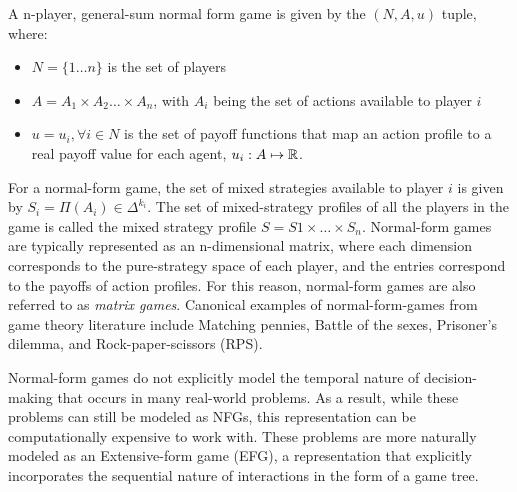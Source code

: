 \begin{definition} A n-player, general-sum normal form game is given by the $(N,
		A, u)$ tuple, where:
	\begin{itemize}
		\item $N = \{1 \dots n \}$ is the set of players
		\item $A =
			      A_1 \times A_2 \ldots \times A_n$, with $A_i$ being the set of actions available to player $i$
		\item $u = {u_i, \forall i \in N}$ is the set of payoff functions that map an action profile to a
		      real payoff value for each agent, $u_i: A \mapsto \mathbb{R}$.
	\end{itemize}
\end{definition}

For a normal-form game, the set of mixed strategies available to player $i$ is given by $S_i =
	\Pi(A_i) \in \Delta^{k_i}$.
The set of mixed-strategy profiles of all the players in the game is called the mixed strategy
profile $S = S1 \times \dots \times S_n$.
Normal-form games are typically represented as an n-dimensional matrix, where each dimension
corresponds to the pure-strategy space of each player, and the entries correspond to the payoffs of
action profiles.
For this reason, normal-form games are also referred to as \textit{matrix games}.
Canonical examples of normal-form-games from game theory literature include Matching pennies,
Battle of the sexes, Prisoner's dilemma, and Rock-paper-scissors (RPS).

Normal-form games do not explicitly model the temporal nature of decision-making that occurs in
many real-world problems.
As a result, while these problems can still be modeled as NFGs, this representation can be
computationally expensive to work with.
These problems are more naturally modeled as an Extensive-form game (EFG), a representation that
explicitly incorporates the sequential nature of interactions in the form of a game tree.

